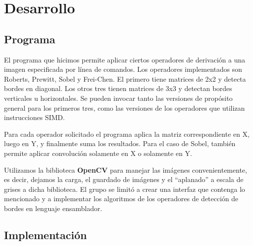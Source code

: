 \section{Desarrollo}

\subsection{Programa}

El programa que hicimos permite aplicar ciertos operadores de derivación a una imagen especificada por línea de comandos. Los operadores implementados son Roberts, Prewitt,  Sobel y Frei-Chen. El primero tiene matrices de 2x2 y detecta bordes en diagonal. Los otros tres tienen matrices de 3x3 y detectan bordes verticales u horizontales. Se pueden invocar tanto las versiones de propósito general para los primeros tres, como las versiones de los operadores que utilizan instrucciones SIMD. 

Para cada operador solicitado el programa aplica la matriz correspondiente en X, luego en Y, y finalmente suma los resultados. Para el caso de Sobel, también permite aplicar convolución solamente en X o solamente en Y.

Utilizamos la biblioteca \textbf{OpenCV} para manejar las imágenes convenientemente, es decir, dejamos la carga, el guardado de imágenes y el ``aplanado'' a escala de grises a dicha biblioteca. El grupo se limitó a crear una interfaz que contenga lo mencionado y a implementar los algoritmos de los operadores de detección de bordes en lenguaje ensamblador. 





\subsection{Implementación}




